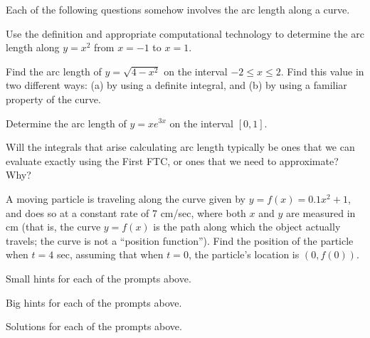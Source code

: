\begin{activity} \label{A:6.1.3}  Each of the following questions somehow involves the arc length along a curve.
\ba
	
	\item Use the definition and appropriate computational technology to determine the arc length along $y = x^2$ from $x = -1$ to $x = 1$.
	\item Find the arc length of $y = \sqrt{4-x^2}$ on the interval $-2 \le x \le 2$.  Find this value in two different ways: (a) by using a definite integral, and (b) by using a familiar property of the curve.
	\item Determine the arc length of $y = xe^{3x}$ on the interval $[0,1]$.
	\item Will the integrals that arise calculating arc length typically be ones that we can evaluate exactly using the First FTC, or ones that we need to approximate?  Why?
	\item A moving particle is traveling along the curve given by $y = f(x) = 0.1x^2 + 1$, and does so at a constant rate of 7 cm/sec, where both $x$ and $y$ are measured in cm (that is, the curve $y = f(x)$ is the path along which the object actually travels; the curve is not a ``position function'').  Find the position of the particle when $t = 4$ sec, assuming that when $t = 0$, the particle's location is $(0,f(0))$.
\ea

\end{activity}
\begin{smallhint}
\ba
	\item Small hints for each of the prompts above.
\ea
\end{smallhint}
\begin{bighint}
\ba
	\item Big hints for each of the prompts above.
\ea
\end{bighint}
\begin{activitySolution}
\ba
	\item Solutions for each of the prompts above.
\ea
\end{activitySolution}
\aftera
